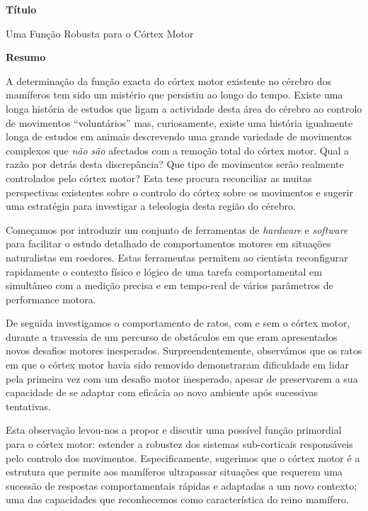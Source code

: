 \label{ch:abstractPT}


\begin{center}
\Large \textbf{T\'{i}tulo}
\end{center}

Uma Função Robusta para o Córtex Motor

\begin{center}
\Large \textbf{Resumo}
\end{center}

A determinação da função exacta do córtex motor existente no cérebro dos mamíferos tem sido um mistério que persistiu ao longo do tempo. Existe uma longa história de estudos que ligam a actividade desta área do cérebro ao controlo de movimentos ``voluntários'' mas, curiosamente, existe uma história igualmente longa de estudos em animais descrevendo uma grande variedade de movimentos complexos que \emph{não são} afectados com a remoção total do córtex motor. Qual a razão por detrás desta discrepância? Que tipo de movimentos serão realmente controlados pelo córtex motor? Esta tese procura reconciliar as muitas perspectivas existentes sobre o controlo do córtex sobre os movimentos e sugerir uma estratégia para investigar a teleologia desta região do cérebro.

Começamos por introduzir um conjunto de ferramentas de \emph{hardware} e \emph{software} para facilitar o estudo detalhado de comportamentos motores em situações naturalistas em roedores. Estas ferramentas permitem ao cientista reconfigurar rapidamente o contexto físico e lógico de uma tarefa comportamental em simultâneo com a medição precisa e em tempo-real de vários parâmetros de performance motora.

De seguida investigamos o comportamento de ratos, com e sem o córtex motor, durante a travessia de um percurso de obstáculos em que eram apresentados novos desafios motores inesperados. Surpreendentemente, observámos que os ratos em que o córtex motor havia sido removido demonstraram dificuldade em lidar pela primeira vez com um desafio motor inesperado, apesar de preservarem a sua capacidade de se adaptar com eficácia ao novo ambiente após sucessivas tentativas.

Esta observação levou-nos a propor e discutir uma possível função primordial para o córtex motor: estender a robustez dos sistemas sub-corticais responsáveis pelo controlo dos movimentos. Especificamente, sugerimos que o córtex motor é a estrutura que permite aos mamíferos ultrapassar situações que requerem uma sucessão de respostas comportamentais rápidas e adaptadas a um novo contexto; uma das capacidades que reconhecemos como característica do reino mamífero.
